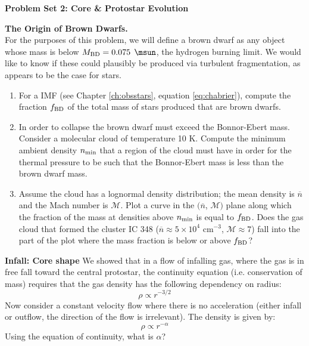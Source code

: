 \documentclass[twoside]{tufte-book} %
\begin{document}
\noindent\textbf{Problem Set 2: Core \& Protostar Evolution}

\item \textbf{The Origin of Brown Dwarfs.}\\
For the purposes of this problem, we will define a brown dwarf as any object
whose mass is below $M_{\rm BD} = 0.075$ $\msun$, the hydrogen burning limit.
We would like to know if these could plausibly be produced via turbulent
fragmentation, as appears to be the case for stars.
\begin{enumerate}
\item For a \citet{chabrier05a} IMF (see Chapter \ref{ch:obsstars}, equation
    \ref{eq:chabrier}), compute the fraction $f_{\rm BD}$ of the total mass of
    stars produced that are brown dwarfs.
\item In order to collapse the brown dwarf must exceed the Bonnor-Ebert mass.
    Consider a molecular cloud of temperature 10 K. Compute the minimum ambient
    density $n_{\rm min}$ that a region of the cloud must have in order for the
    thermal pressure to be such that the Bonnor-Ebert mass is less than the
    brown dwarf mass.
\item Assume the cloud has a lognormal density distribution; the mean density
    is $\overline{n}$ and the Mach number is $\mathcal{M}$. Plot a curve in the
    $(\overline{n}$, $\mathcal{M})$ plane along which the fraction of the mass
    at densities above $n_{\rm min}$ is equal to $f_{\rm BD}$. Does the gas
    cloud that formed the cluster IC 348 ($\overline{n} \approx 5\times 10^4$
    cm$^{-3}$, $\mathcal{M}\approx 7$) fall into the part of the plot where the
    mass fraction is below or above $f_{\rm BD}$?
\end{enumerate}

\item \textbf{Infall: Core shape}
We showed that in a flow of infalling gas, where the gas is in free fall toward the central
protostar, the continuity equation (i.e. conservation of mass) requires that the gas density
has the following dependency on radius:
\begin{equation}
    \rho\propto r^{-3/2} 
\end{equation}
Now consider a constant velocity flow where there is no acceleration (either infall or outflow,
the direction of the flow is irrelevant). The density is given by:
\begin{equation}
\rho \propto r^{-\alpha}
\end{equation}
Using the equation of continuity, what is $\alpha$?
\end{document}
